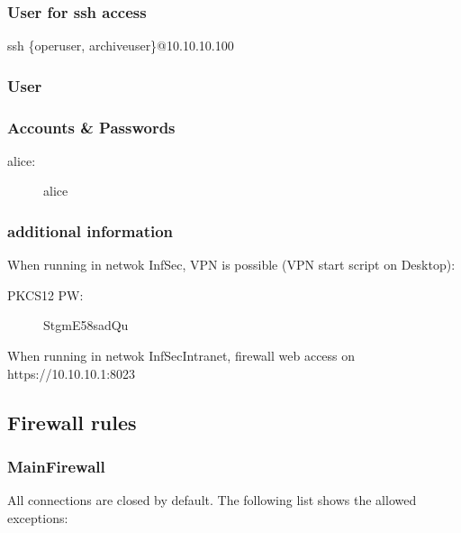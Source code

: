 \documentclass[a4paper, toc=index, 12pt, DIV14, twoside, BCOR2cm, headsepline, numbers=noenddot, bibliography=totoc]{scrbook}
\begin{document}
\subsubsection*{User for ssh access}
ssh \{operuser, archiveuser\}@10.10.10.100

\subsubsection{User}
\subsubsection*{Accounts \& Passwords}
\begin{description}
\item[alice:] alice
\end{description}
\subsubsection*{additional information}
When running in netwok InfSec, VPN is possible (VPN start script on Desktop):\newline
\begin{description}
\item[PKCS12 PW:] StgmE58sadQu
\end{description}
When running in netwok InfSecIntranet, firewall web access on https://10.10.10.1:8023


\subsection{Firewall rules}
\subsubsection{MainFirewall}
All connections are closed by default. The following list shows the allowed exceptions:\newline
\end{document}
